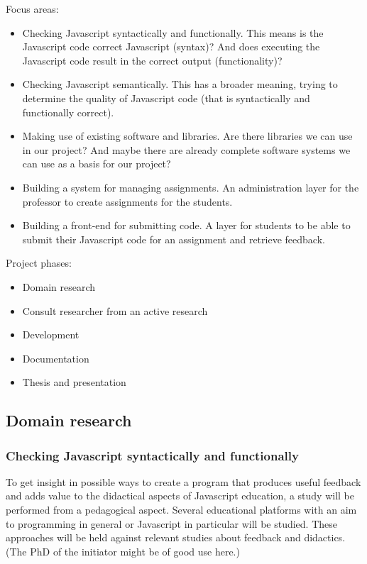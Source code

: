 \documentclass{article}
\begin{document}
\begin{itemize}
Focus areas:
\begin{itemize}
  \item Checking Javascript syntactically and functionally. This means is the Javascript code correct Javascript (syntax)? And does executing the Javascript code result in the correct output (functionality)?
  \item Checking Javascript semantically. This has a broader meaning, trying to determine the quality of Javascript code (that is syntactically and functionally correct).
  \item Making use of existing software and libraries. Are there libraries we can use in our project? And maybe there are already complete software systems we can use as a basis for our project?
  \item Building a system for managing assignments. An administration layer for the professor to create assignments for the students.
  \item Building a front-end for submitting code. A layer for students to be able to submit their Javascript code for an assignment and retrieve feedback.
\end{itemize}

Project phases:
\begin{itemize}
  \item Domain research
  \item Consult researcher from an active research
  \item Development
  \item Documentation
  \item Thesis and presentation
\end{itemize}


\subsection{Domain research}

\subsubsection{Checking Javascript syntactically and functionally}
To get insight in possible ways to create a program that produces useful feedback and adds value to the didactical aspects of Javascript education, a study will be performed from a pedagogical aspect. Several educational platforms with an aim to programming in general or Javascript in particular will be studied. These approaches will be held against relevant studies about feedback and didactics. (The PhD of the initiator might be of good use here.)

\end{itemize}
\end{document}
